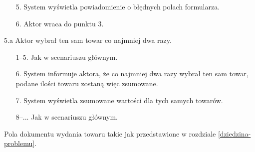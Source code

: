 \begin{usecase}
{\begin{enumerate}
        \item[5.] System wyświetla powiadomienie o błędnych polach formularza.
        \item[6.] Aktor wraca do punktu 3.
      \end{enumerate}
     \item[5.a] Aktor wybrał ten sam towar co najmniej dwa razy.
       \begin{enumerate}
       \item[1--5.] Jak w scenariuszu głównym.
       \item[6.] System informuje aktora, że co najmniej dwa razy wybrał ten sam towar, podane ilości towaru zostaną więc zsumowane.
       \item[7.] System wyświetla zsumowane wartości dla tych samych towarów.
       \item[8--...] Jak w scenariuszu głównym.
       \end{enumerate}
  }
   {
    Pola dokumentu wydania towaru takie jak przedstawione w rozdziale \ref{dziedzina-problemu}.
  }
\end{usecase}





